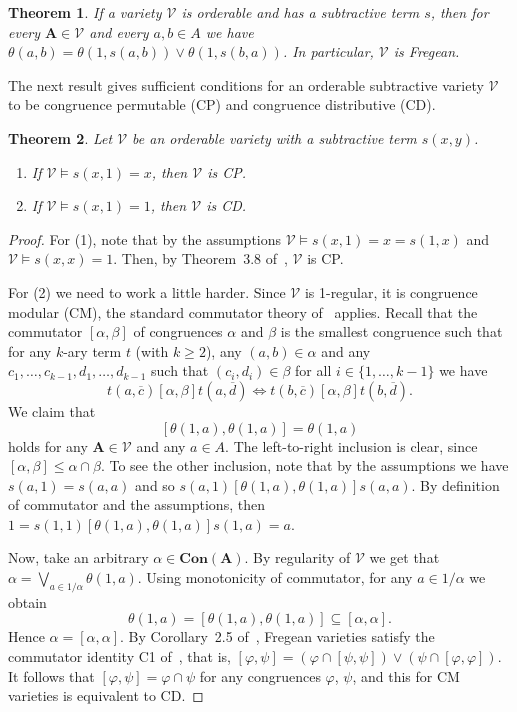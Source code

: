 \documentclass{amsart}
\newtheorem{theorem}{Theorem}[section]
\newcommand{\alg}[1]{\mathbf{#1}}
\def\comm#1#2{\mathbin{[#1,#2]}}
\begin{document}
\begin{theorem}\label{thm:1-orderable-subtr}
If a variety $\mathcal{V}$ is orderable and has a subtractive term $s$, then
for every $\alg{A}\in\mathcal{V}$ and every $a,b\in A$ we have
$\theta(a,b) = \theta(1,s(a,b))\vee\theta(1,s(b,a))$. In particular,
$\mathcal{V}$ is Fregean.
\end{theorem}  

The next result gives sufficient conditions for an orderable subtractive
variety $\mathcal{V}$ to be congruence permutable (CP) and congruence
distributive (CD). 


\begin{theorem}\label{thm:subtr-order-CD-CP} 
Let $\mathcal{V}$ be an orderable variety with a subtractive term $s(x,y)$.
\begin{enumerate}
\item If\/ $\mathcal{V}\models s(x,1) = x$, then $\mathcal{V}$ is CP.
\item If\/ $\mathcal{V}\models s(x,1) = 1$, then $\mathcal{V}$ is CD.
\end{enumerate}
\end{theorem}

\begin{proof}
For (1), note that by the assumptions
$\mathcal{V}\models s(x,1) = x = s(1,x)$ and $\mathcal{V}\models s(x,x) = 1$.
Then, by Theorem~3.8 of~\cite{ISW09}, $\mathcal{V}$ is CP.

For (2) we need to work a little harder. Since $\mathcal{V}$ is 1-regular, it is
congruence modular (CM), the standard commutator theory of~\cite{COMM} 
applies. Recall that
the commutator $\comm{\alpha}{\beta}$ of congruences $\alpha$ and $\beta$ is the
smallest congruence such that for any $k$-ary term $t$ (with $k\geq 2$),
any $(a,b)\in \alpha$ and any $c_1,\dots,c_{k-1}, d_1,\dots,d_{k-1}$ such that
$(c_i,d_i)\in\beta$ for all $i\in\{1,\dots,k-1\}$ we have
$$
t(a,\overline{c})\comm{\alpha}{\beta}t(a,\overline{d})
\iff
t(b,\overline{c})\comm{\alpha}{\beta}t(b,\overline{d}).
$$
We claim that
$$
\comm{\theta(1,a)}{\theta(1,a)} = \theta(1,a)
$$
holds for any $\alg{A}\in\mathcal{V}$ and any $a\in A$.
The left-to-right inclusion is clear, since $\comm{\alpha}{\beta}\leq
\alpha\cap\beta$. To see the other inclusion,
note that by the assumptions we have $s(a,1) = s(a,a)$ and so
$s(a,1)\comm{\theta(1,a)}{\theta(1,a)} s(a,a)$. By definition
of commutator and the assumptions, then
$1 = s(1,1)\comm{\theta(1,a)}{\theta(1,a)} s(1,a) = a$.

Now, take an arbitrary $\alpha\in \alg{Con}(\alg{A})$. By regularity of 
$\mathcal{V}$ we get that $\alpha = \bigvee_{a\in 1/\alpha}\theta(1,a)$. 
Using monotonicity of commutator, for any $a\in 1/\alpha$ we obtain
$$
\theta(1,a) = \comm{\theta(1,a)}{\theta(1,a)} \subseteq \comm{\alpha}{\alpha}.
$$
Hence $\alpha = \comm{\alpha}{\alpha}$. By Corollary~2.5 of~\cite{ISW09},
Fregean varieties satisfy the commutator identity C1 of~\cite{COMM}, that is,
$\comm{\varphi}{\psi} =
(\varphi\cap\comm{\psi}{\psi})\vee(\psi\cap\comm{\varphi}{\varphi})$.
It follows that $\comm{\varphi}{\psi} = \varphi\cap\psi$ for any
congruences $\varphi$, $\psi$, and this for CM varieties is equivalent to
CD.
\end{proof}  
\end{document}
